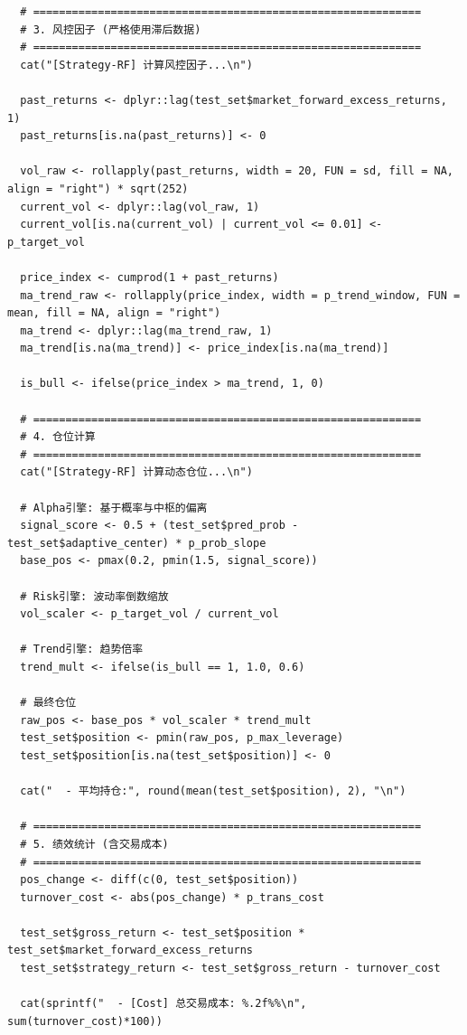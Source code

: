 \documentclass[11pt, a4paper]{article}
\begin{document}
\begin{verbatim}
  # ============================================================
  # 3. 风控因子 (严格使用滞后数据)
  # ============================================================
  cat("[Strategy-RF] 计算风控因子...\n")
  
  past_returns <- dplyr::lag(test_set$market_forward_excess_returns, 1)
  past_returns[is.na(past_returns)] <- 0
  
  vol_raw <- rollapply(past_returns, width = 20, FUN = sd, fill = NA, align = "right") * sqrt(252)
  current_vol <- dplyr::lag(vol_raw, 1)
  current_vol[is.na(current_vol) | current_vol <= 0.01] <- p_target_vol

  price_index <- cumprod(1 + past_returns)
  ma_trend_raw <- rollapply(price_index, width = p_trend_window, FUN = mean, fill = NA, align = "right")
  ma_trend <- dplyr::lag(ma_trend_raw, 1)
  ma_trend[is.na(ma_trend)] <- price_index[is.na(ma_trend)]
  
  is_bull <- ifelse(price_index > ma_trend, 1, 0)
  
  # ============================================================
  # 4. 仓位计算
  # ============================================================
  cat("[Strategy-RF] 计算动态仓位...\n")
  
  # Alpha引擎: 基于概率与中枢的偏离
  signal_score <- 0.5 + (test_set$pred_prob - test_set$adaptive_center) * p_prob_slope
  base_pos <- pmax(0.2, pmin(1.5, signal_score))
  
  # Risk引擎: 波动率倒数缩放
  vol_scaler <- p_target_vol / current_vol
  
  # Trend引擎: 趋势倍率
  trend_mult <- ifelse(is_bull == 1, 1.0, 0.6)
  
  # 最终仓位
  raw_pos <- base_pos * vol_scaler * trend_mult
  test_set$position <- pmin(raw_pos, p_max_leverage)
  test_set$position[is.na(test_set$position)] <- 0
  
  cat("  - 平均持仓:", round(mean(test_set$position), 2), "\n")
  
  # ============================================================
  # 5. 绩效统计 (含交易成本)
  # ============================================================
  pos_change <- diff(c(0, test_set$position))
  turnover_cost <- abs(pos_change) * p_trans_cost
  
  test_set$gross_return <- test_set$position * test_set$market_forward_excess_returns
  test_set$strategy_return <- test_set$gross_return - turnover_cost
  
  cat(sprintf("  - [Cost] 总交易成本: %.2f%%\n", sum(turnover_cost)*100))
  

\end{verbatim}
\end{document}
